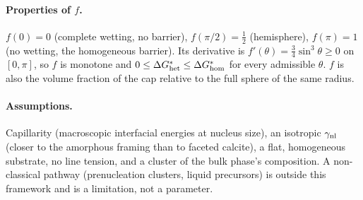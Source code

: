 \paragraph{Properties of $f$.} $f(0)=0$ (complete wetting, no barrier), $f(\pi/2)=\tfrac12$
(hemisphere), $f(\pi)=1$ (no wetting, the homogeneous barrier). Its derivative is
$f'(\theta)=\tfrac34\sin^{3}\theta\ge0$ on $[0,\pi]$, so $f$ is monotone and
$0\le\Delta G^{*}_\mathrm{het}\le\Delta G^{*}_\mathrm{hom}$ for every admissible $\theta$. $f$ is also the volume fraction of the cap
relative to the full sphere of the same radius.

\paragraph{Assumptions.} Capillarity (macroscopic interfacial energies at nucleus size), an
isotropic $\gamma_\mathrm{nl}$ (closer to the amorphous framing than to faceted calcite), a flat, homogeneous
substrate, no line tension, and a cluster of the bulk phase's composition. A non-classical
pathway (prenucleation clusters, liquid precursors) is outside this framework and is a
limitation, not a parameter.

